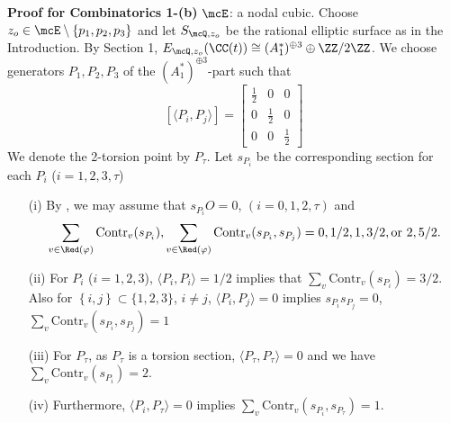  \bigskip
 
 
{\bf Proof for Combinatorics 1-(b)}  $\mcE$: a nodal cubic. Choose $z_o \in \mcE\setminus \{p_1, p_2, p_3\}$ and let $S_{\mcQ, z_o}$ be
the rational elliptic surface as in the Introduction. 
By Section 1, $E_{\mcQ, z_o}(\CC(t)) \cong
(A_1^*)^{\oplus 3}\oplus \ZZ/2\ZZ$. We choose generators $P_1, P_2, P_3$ of the  $(A_1^*)^{\oplus 3}$-part
such that
\[
[\langle P_i, P_j\rangle]=\left[ \begin{array}{ccc} \frac{1}{2}  & 0 & 0 \\ 0 & \frac{1}{2}  & 0 \\ 0 & 0 &\frac{1}{2} \end{array}\right]
\]
We denote the 2-torsion point by $P_{\tau}$. Let $s_{P_i}$ be the corresponding section for each $P_i$ ($i=1,2,3,\tau$)

\begin{enumerate}
\item[(i)] By \cite[Theorem 10.8]{shioda90}, we may assume that $s_{P_i}O=0$, $(i=0,1, 2,\tau)$ and
\[
\sum_{v \in  \Red(\varphi)}\mathrm{Contr}_v(s_{P_i}),  
  \sum_{v \in  \Red(\varphi)}\mathrm {Contr}_v(s_{P_i}, s_{P_j}) = 0, 1/2, 1, 3/2, \mbox{\rm or}\,\,  2, 5/2.
\]
\item[(ii)] For $P_i$ ($i=1,2,3$), $\langle P_i, P_i\rangle= 1/2$ implies that $\sum_v\mathrm{Contr}_v(s_{P_i})=3/2$. Also for $\left\{i,j\right\}\subset\{1,2,3\}$, $i\not=j$, $\langle P_i, P_j\rangle=0$ implies $s_{P_i}s_{P_j}=0$, $\sum_v\mathrm{Contr}_v(s_{P_i}, s_{P_j})=1$
\item[(iii)] For $P_\tau$, as $P_\tau$ is a torsion section, $ \langle P_\tau, P_\tau\rangle=0$ and we have $\sum_v\mathrm{Contr}_v(s_{P_i})=2$.
\item[(iv)] Furthermore, $\langle P_i, P_\tau\rangle=0$ implies  $\sum_v\mathrm{Contr}_v(s_{P_i}, s_{P_\tau})=1$.
\end{enumerate}

